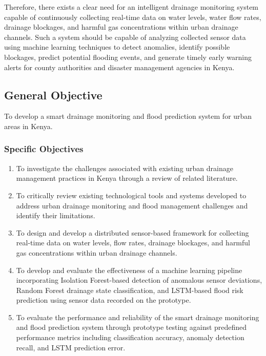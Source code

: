 \documentclass[12pt, a4paper]{article}
\begin{document}
Therefore, there exists a clear need for an intelligent drainage monitoring system capable of continuously collecting real-time data on water levels, water flow rates, drainage blockages, and harmful gas concentrations within urban drainage channels. Such a system should be capable of analyzing collected sensor data using machine learning techniques to detect anomalies, identify possible blockages, predict potential flooding events, and generate timely early warning alerts for county authorities and disaster management agencies in Kenya.

\subsection{General Objective}
\label{sec:objectives}

To develop a smart drainage monitoring and flood prediction system for urban areas in Kenya.
\subsubsection{Specific Objectives}

\begin{enumerate}[label=\roman*.]

\item To investigate the challenges associated with existing
urban drainage management practices in Kenya through a review
of related literature.

\item To critically review existing technological tools and
systems developed to address urban drainage monitoring and
flood management challenges and identify their limitations.

\item To design and develop a distributed sensor-based framework
for collecting real-time data on water levels, flow rates,
drainage blockages, and harmful gas concentrations within
urban drainage channels.

\item To develop and evaluate the effectiveness of a machine
learning pipeline incorporating Isolation Forest-based
detection of anomalous sensor deviations, Random Forest
drainage state classification, and LSTM-based flood risk
prediction using sensor data recorded on the prototype.

\item To evaluate the performance and reliability of the
smart drainage monitoring and flood prediction
system through prototype testing against predefined
performance metrics including classification accuracy,
anomaly detection recall, and LSTM prediction error.

\end{enumerate}
\end{document}
